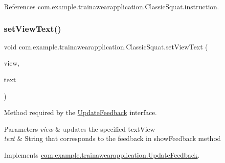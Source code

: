 \begin{DoxyCode}{0}

\end{DoxyCode}


References com.\+example.\+trainawearapplication.\+Classic\+Squat.\+instruction.

\mbox{\label{classcom_1_1example_1_1trainawearapplication_1_1_classic_squat_ab193e39e2f1255fd88d0508cfe7a63ff}} 
\subsubsection{\texorpdfstring{setViewText()}{setViewText()}}
{\footnotesize\ttfamily void com.\+example.\+trainawearapplication.\+Classic\+Squat.\+set\+View\+Text (\begin{DoxyParamCaption}\item[{Text\+View}]{view,  }\item[{String}]{text }\end{DoxyParamCaption})}



Method required by the \mbox{\hyperlink{interfacecom_1_1example_1_1trainawearapplication_1_1_update_feedback}{Update\+Feedback}} interface. 


\begin{DoxyParams}{Parameters}
{\em view} & updates the specified text\+View \\
\hline
{\em text} & String that corresponds to the feedback in show\+Feedback method \\
\hline
\end{DoxyParams}


Implements \mbox{\hyperlink{interfacecom_1_1example_1_1trainawearapplication_1_1_update_feedback_a7a026880188b11aca6d8184d57e699e8}{com.\+example.\+trainawearapplication.\+Update\+Feedback}}.



